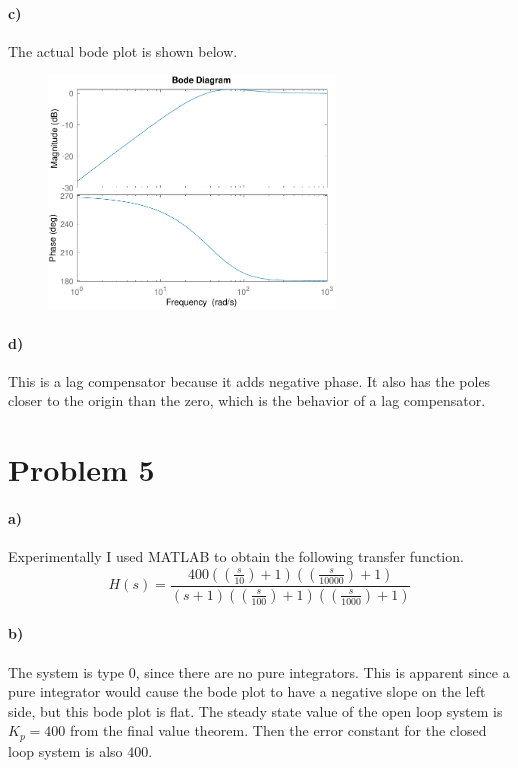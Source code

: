 \documentclass[12pt]{article}
\begin{document}
\paragraph{c)}

The actual bode plot is shown below.
\begin{figure}[H]
    \begin{center}
        \includegraphics[width=3in]{problem4c.pdf}
    \end{center}
\end{figure}

\paragraph{d)}

This is a lag compensator because it adds negative phase. It also has the poles closer to the origin than the zero, which
is the behavior of a lag compensator.

\section*{Problem 5}

\paragraph{a)}

Experimentally I used MATLAB to obtain the following transfer function.
\[H(s)=\frac{400\left(\left(\frac{s}{10}\right)+1\right)\left(\left(\frac{s}{10000}\right)+1\right)}{(s+1)\left(\left(\frac{s}{100}\right)+1\right)\left(\left(\frac{s}{1000}\right)+1\right)}\]

\paragraph{b)}

The system is type 0, since there are no pure integrators. This is apparent since a pure integrator would cause the bode plot to have a negative slope on the left side, but this
bode plot is flat. The steady state value of the open loop system is \(K_p=400\) from the final value theorem. Then the error constant for the closed loop
system is also \(400\).
\end{document}
